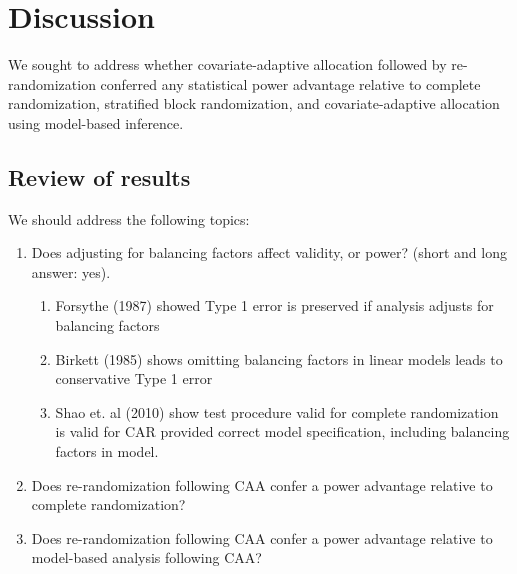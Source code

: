 \section{Discussion}
We sought to address whether covariate-adaptive allocation followed by re-randomization conferred any statistical power advantage relative to complete randomization, stratified block randomization, and covariate-adaptive allocation using model-based inference.

\subsection{Review of results}
We should address the following topics:
\begin{enumerate}
	\item Does adjusting for balancing factors affect validity, or power? (short and long answer: yes).
	\begin{enumerate}
		\item Forsythe (1987) showed Type 1 error is preserved if analysis adjusts for balancing factors
		\item Birkett (1985) shows omitting balancing factors in linear models leads to conservative Type 1 error
		\item Shao et. al (2010) show test procedure valid for complete randomization is valid for CAR provided correct model specification, including balancing factors in model.
	\end{enumerate}
	\item Does re-randomization following CAA confer a power advantage relative to complete randomization?
	\item Does re-randomization following CAA confer a power advantage relative to model-based analysis following CAA?
\end{enumerate}

